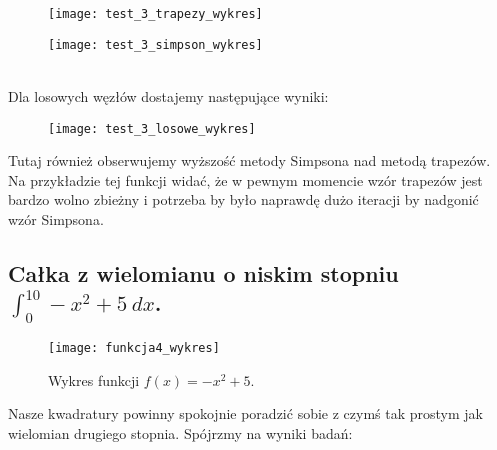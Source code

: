 \documentclass{article}
\begin{document}
  \begin{minipage}{\linewidth}
      \centering
      \begin{minipage}{0.35\linewidth}
          \begin{figure}[H]
              \texttt{[image: test\_3\_trapezy\_wykres]}
          \end{figure}
      \end{minipage}
      \hspace{0.05\linewidth}
      \begin{minipage}{0.35\linewidth}
          \begin{figure}[H]
              \texttt{[image: test\_3\_simpson\_wykres]}
          \end{figure}
      \end{minipage}
  \end{minipage}\\


Dla losowych węzłów dostajemy następujące wyniki:

\begin{figure}[h!]
\centering
\texttt{[image: test\_3\_losowe\_wykres]}
\end{figure}

Tutaj również obserwujemy wyższość metody Simpsona nad metodą trapezów. Na przykładzie tej funkcji widać, że w pewnym momencie wzór trapezów jest bardzo wolno zbieżny i potrzeba by było naprawdę dużo iteracji by nadgonić wzór Simpsona.

\pagebreak


\subsection{Całka z wielomianu o niskim stopniu $\int_{0}^{10} -x^2 + 5 \ dx $.}


\begin{figure}[h!]
\centering
\texttt{[image: funkcja4\_wykres]}
\caption{Wykres funkcji $f(x) = -x^2 + 5$.}	
\end{figure}


Nasze kwadratury powinny spokojnie poradzić sobie z czymś tak prostym jak wielomian drugiego stopnia. Spójrzmy na wyniki badań:
\end{document}

